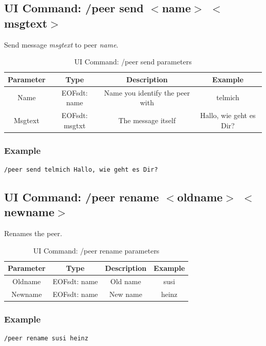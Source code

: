 \subsection{UI Command: /peer send $<$name$>$ $<$msgtext$>$}
Send message \textit{msgtext} to peer \textit{name}.

%
\begin{longtable}{|c|c|c|c|}
\caption{UI Command: /peer send parameters}\\
\hline
\textbf{Parameter} & \textbf{Type} & \textbf{Description} & \textbf{Example}\\
\hline
Name & EOFsdt: name & Name you identify the peer with & telmich\\
\hline
Msgtext & EOFsdt: msgtxt & The message itself & Hallo, wie geht es Dir?\\
\hline
\end{longtable}

\subsubsection{Example}
\begin{verbatim}
/peer send telmich Hallo, wie geht es Dir?
\end{verbatim}
\subsection{UI Command: /peer rename $<$oldname$>$ $<$newname$>$}
Renames the peer.
%
\begin{longtable}{|c|c|c|c|}
\caption{UI Command: /peer rename parameters}\\
\hline
\textbf{Parameter} & \textbf{Type} & \textbf{Description} & \textbf{Example}\\
\hline
Oldname & EOFsdt: name & Old name & susi\\
\hline
Newname & EOFsdt: name & New name & heinz\\
\hline
\end{longtable}

\subsubsection{Example}
\begin{verbatim}
/peer rename susi heinz
\end{verbatim}
